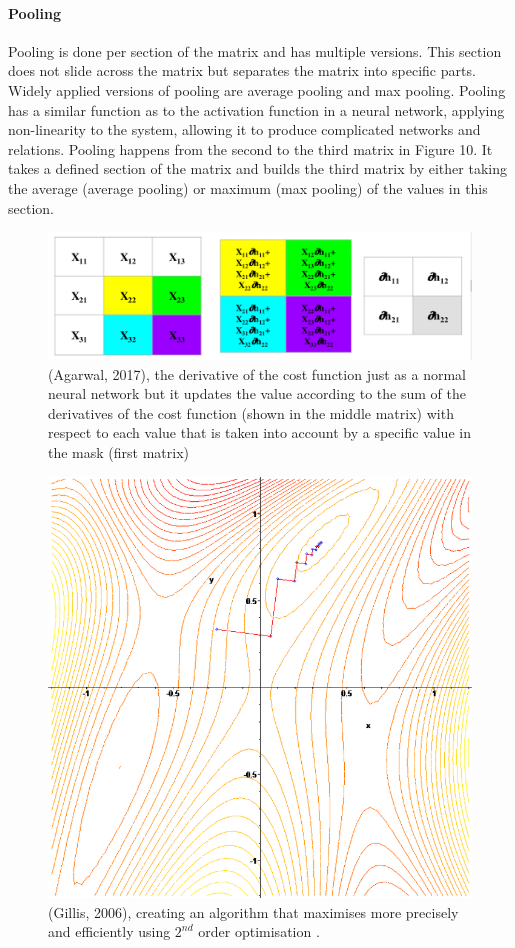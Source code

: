 \paragraph{Pooling}
Pooling is done per section of the matrix and has multiple versions. This section does not slide across the matrix but separates the matrix into specific parts. Widely applied versions of pooling are average pooling and max pooling. Pooling has a similar function as to the activation function in a neural network, applying non-linearity to the system, allowing it to produce complicated networks and relations. Pooling happens from the second to the third matrix in Figure 10. It takes a defined section of the matrix and builds the third matrix by either taking the average (average pooling) or maximum (max pooling) of the values in this section. 
\begin{figure}[h]
	\includegraphics[width=\textwidth]{fig11.png} 
	\caption{(Agarwal, 2017), the derivative of the cost function just as a normal neural network but it updates the value according to the sum of the derivatives of the cost function (shown in the middle matrix) with respect to each value that is taken into account by a specific value in the mask (first matrix)}
\end{figure}
\begin{figure}
	\includegraphics[width=\columnwidth]{fig12.png} 
	\caption{(Gillis, 2006), creating an algorithm that maximises more precisely and  efficiently using $2^{nd}$ order optimisation .}
\end{figure}
